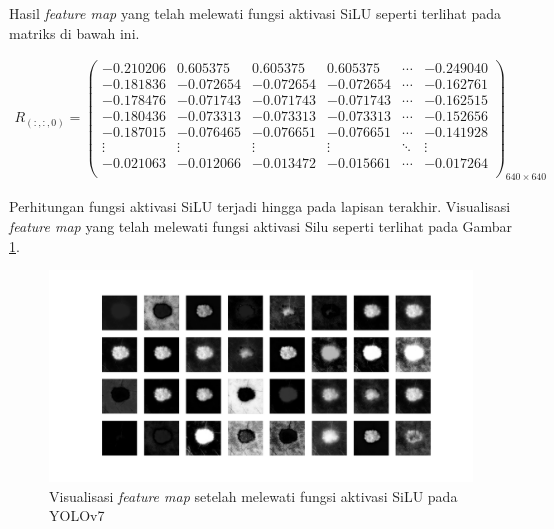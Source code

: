     Hasil \textit{feature map} yang telah melewati fungsi aktivasi SiLU seperti terlihat pada matriks di bawah ini.

    \begin{align*}
        R_{(:, :, 0)} = 
        \begin{pmatrix}
            -0.210206 & 0.605375  & 0.605375  & 0.605375  & \cdots & -0.249040 \\
            -0.181836 & -0.072654 & -0.072654 & -0.072654 & \cdots & -0.162761 \\
            -0.178476 & -0.071743 & -0.071743 & -0.071743 & \cdots & -0.162515 \\
            -0.180436 & -0.073313 & -0.073313 & -0.073313 & \cdots & -0.152656 \\
            -0.187015 & -0.076465 & -0.076651 & -0.076651 & \cdots & -0.141928 \\
            \vdots    & \vdots    & \vdots    & \vdots    & \ddots & \vdots \\
            -0.021063 & -0.012066 & -0.013472 & -0.015661 & \cdots & -0.017264 \\
        \end{pmatrix}_{640\times 640}
    \end{align*}

    Perhitungan fungsi aktivasi SiLU terjadi hingga pada lapisan terakhir. Visualisasi \textit{feature map} yang telah melewati fungsi aktivasi Silu seperti terlihat pada Gambar \ref{fig:d-silu}.

    \begin{figure}[H]
        \begin{center}
            \includegraphics[width=12cm]{img/bab4/silu-layer.png}
            \caption{Visualisasi \textit{feature map} setelah melewati fungsi aktivasi SiLU pada YOLOv7}
            \label{fig:d-silu}
        \end{center}
    \end{figure}

